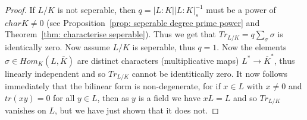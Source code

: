 \documentclass[twoside, a4paper, 10pt]{amsart}
\begin{document}
\begin{proof} If $L/K$ is not seperable, then $q = |L:K||L:K|_s^{-1}$ must be a power of $char K \neq 0$ (see Proposition~\ref{prop: seperable degree prime power} and Theorem~\ref{thm: characterise seperable}). Thus we get that $Tr_{L/K} = q \sum_{\sigma} \sigma$ is identically zero. Now assume $L/K$ is seperable, thus $q = 1$. Now the elements $\sigma \in Hom_K(L, \overline{K})$ are distinct characters (multiplicative maps) $L^* \to \overline{K}^*$, thus linearly independent and so $Tr_{L/K}$ cannot be identitically zero. It now follows immediately that the bilinear form is non-degenerate, for if $x \in L$ with $x \neq 0$ and $tr(xy) = 0$ for all $y \in L$, then as $y$ is a field we have $xL=L$ and so $Tr_{L/K}$ vanishes on $L$, but we have just shown that it does not. \end{proof}
\end{document}
